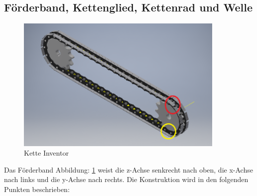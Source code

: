 \subsection{Förderband, Kettenglied, Kettenrad und Welle}

\begin{figure}[H]
\begin{center}
\includegraphics[width=10cm]{Bilder/Inventor/Kette}
\caption{Kette Inventor}
\label{Kette_Inventor} 
\end{center}
\end{figure}


Das Förderband Abbildung: \ref{Kette_Inventor} weist die z-Achse senkrecht nach oben, die x-Achse nach links und die y-Achse nach rechts. Die Konstruktion wird in den folgenden Punkten beschrieben:

